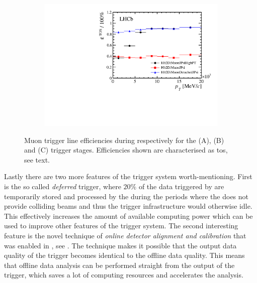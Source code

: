 \begin{figure}[t!]
\begin{subfigure}{0.5\textwidth}
    \includegraphics[width=\textwidth,trim=0.45cm 0cm 0.4cm 0cm, clip=true]{Figures/Chapter2/hlt2_muon_eff}
    \caption{}
    \label{det_run_one_hlt2_muon_line_eff}
  \end{subfigure}
  \caption{Muon trigger line efficiencies during \runone respectively for the \lzero (A), \hltone (B) and \hlttwo (C) trigger stages.
           Efficiencies shown are characterised as tos, see text.}
  \label{det_run_one_muon_line_eff}
\end{figure}

Lastly there are two more features of the \lhcb trigger system worth-mentioning. First is the so called
{\it deferred} trigger, where $20\%$ of the data triggered by \lzero are temporarily stored and processed by the \hlt
during the periods where the \lhc does not provide colliding beams and thus the \lhcb trigger infrastructure
would otherwise idle. This effectively increases the amount of available computing power which can be used
to improve other features of the trigger system. The second interesting feature is the novel technique of
{\it online detector alignment and calibration} that was enabled in \runtwo, see \cite{Aaij:2016rxn}.
The technique makes it possible that the output data quality of the trigger becomes identical to the offline data quality.
This means that offline data analysis can be performed straight from the output of the trigger, which saves
a lot of computing resources and accelerates the analysis.
